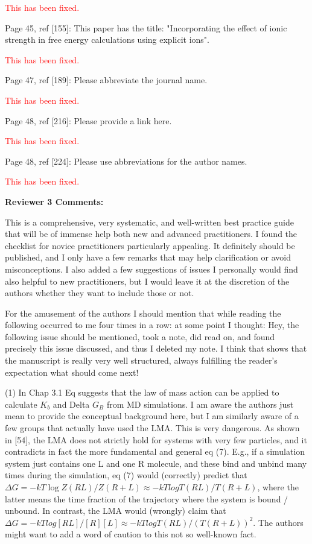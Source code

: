 \documentclass[11pt,a4paper]{letter} %
\begin{document}
\begin{letter}
\textcolor{red}{This has been fixed.}

Page 45, ref [155]: This paper has the title: "Incorporating the effect of ionic strength in free energy calculations using explicit ions".

\textcolor{red}{This has been fixed.}

Page 47, ref [189]: Please abbreviate the journal name.

\textcolor{red}{This has been fixed.}

Page 48, ref [216]: Please provide a link here.

\textcolor{red}{This has been fixed.}

Page 48, ref [224]: Please use abbreviations for the author names.

\textcolor{red}{This has been fixed.}

\textbf{Reviewer 3 Comments:}

This is a comprehensive, very systematic, and well-written best practice guide that will be of immense help both new and advanced practitioners. I found the checklist for novice practitioners particularly appealing. It definitely should be published, and I only have a few remarks that may help clarification or avoid misconceptions. I also added a few suggestions of issues I personally would find also helpful to new practitioners, but I would leave it at the discretion of the authors whether they want to include those or not.

For the amusement of the authors I should mention that while reading the following occurred to me four times in a row: at some point I thought: Hey, the following issue should be mentioned, took a note, did read on, and found precisely this issue discussed, and thus I deleted my note. I think that shows that the manuscript is really very well structured, always fulfilling the reader's expectation what should come next!

(1) In Chap 3.1 Eq suggests that the law of mass action can be applied to calculate $K_b$ and Delta $G_B$ from MD simulations. I am aware the authors just mean to provide the conceptual background here, but I am similarly aware of a few groups that actually have used the LMA. This is very dangerous. As shown in [54], the LMA does not strictly hold for systems with very few particles, and it contradicts in fact the more fundamental and general eq (7). E.g., if a simulation system just contains one L and one R molecule, and these bind and unbind many times during the simulation, eq (7) would (correctly) predict that $\Delta G = -kT \log Z(RL)/Z(R+L) \approx -kT log T(RL)/T(R+L)$, where the latter means the time fraction of the trajectory where the system is bound / unbound. In contrast, the LMA would (wrongly) claim that $\Delta G = -kT log [RL]/[R][L] \approx -kT log T(RL)/(T(R+L))^2$. The authors might want to add a word of caution to this not so well-known fact.


\end{letter}
\end{document}
